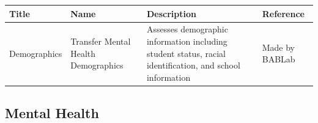 \documentclass[]{book}
\begin{document}
\begin{longtable}[]{@{}llll@{}}
\toprule
\begin{minipage}[b]{0.22\columnwidth}\raggedright
Title\strut
\end{minipage} & \begin{minipage}[b]{0.27\columnwidth}\raggedright
Name\strut
\end{minipage} & \begin{minipage}[b]{0.22\columnwidth}\raggedright
Description\strut
\end{minipage} & \begin{minipage}[b]{0.18\columnwidth}\raggedright
Reference\strut
\end{minipage}\tabularnewline
\midrule
\endhead
\begin{minipage}[t]{0.22\columnwidth}\raggedright
Demographics\strut
\end{minipage} & \begin{minipage}[t]{0.27\columnwidth}\raggedright
Transfer Mental Health Demographics\strut
\end{minipage} & \begin{minipage}[t]{0.22\columnwidth}\raggedright
Assesses demographic information including student status, racial identification, and school information\strut
\end{minipage} & \begin{minipage}[t]{0.18\columnwidth}\raggedright
Made by BABLab\strut
\end{minipage}\tabularnewline
\bottomrule
\end{longtable}

\hypertarget{mental-health}{%
\subsection{Mental Health}\label{mental-health}}
\end{document}
